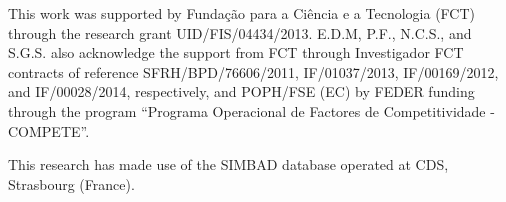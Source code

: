 \documentclass{aa}
\begin{document}
\begin{acknowledgements}

This work was supported by Funda\c{c}\~ao para a Ci\^encia e a
Tecnologia (FCT) through the research grant UID/FIS/04434/2013.
E.D.M, P.F., N.C.S., and S.G.S. also acknowledge the support from FCT
through Investigador FCT contracts of reference SFRH/BPD/76606/2011,
IF/01037/2013, IF/00169/2012, and IF/00028/2014, respectively, and
POPH/FSE (EC) by FEDER funding through the program “Programa
Operacional de Factores de Competitividade - COMPETE”.

This research has made use of the SIMBAD database operated at CDS,
Strasbourg (France).

\end{acknowledgements}








\end{document}

